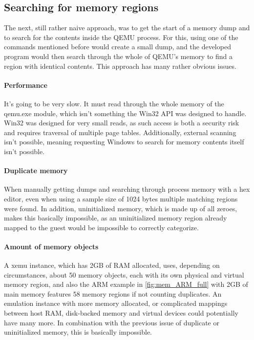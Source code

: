\subsection{Searching for memory regions}
The next, still rather naive approach,
was to get the start of a memory dump and to search for the contents inside the QEMU process.
For this, using one of the commands mentioned before would create a small dump,
and the developed program would then search through the whole of QEMU's memory
to find a region with identical contents.
This approach has many rather obvious issues.

\paragraph{Performance} It's going to be very slow.
It must read through the whole memory of the qemu.exe module,
which isn't something the Win32 API was designed to handle.
Win32 was designed for very small reads, as such access is both a security risk
and requires traversal of multiple page tables.
Additionally, external scanning isn't possible,
meaning requesting Windows to search for memory contents itself isn't possible.

\paragraph{Duplicate memory}
When manually getting dumps and searching through process memory with a hex editor,
even when using a sample size of 1024 bytes multiple matching regions were found.
In addition, uninitialized memory, which is made up of all zeroes,
makes this basically impossible,
as an uninitialized memory region already mapped to the guest would be impossible to correctly categorize.

\paragraph{Amount of memory objects}
A xemu\cite{xemu} instance, which has 2GB of RAM allocated, uses, depending on circumstances,
about 50 memory objects, each with its own physical and virtual memory region,
and also the ARM example in \autoref{fig:mem_ARM_full} with 2GB of main memory features 58 memory regions if not counting duplicates.
An emulation instance with more memory allocated,
or complicated mappings between host RAM, disk-backed memory and virtual devices could potentially have many more.
In combination with the previous issue of duplicate or uninitialized memory, this is basically impossible.

